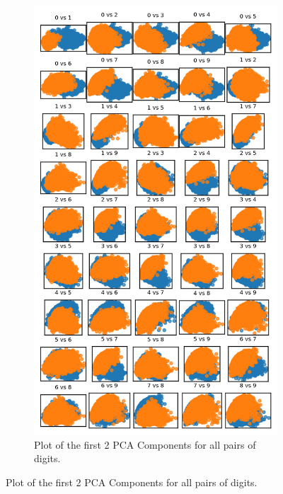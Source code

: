 \documentclass{article}
\begin{document}
\begin{figure}[h!]
    \centering
    \begin{subfigure}[t]{0.45\textwidth}
        \centering
        \includegraphics[width=\textwidth]{./plots/plot2.png} %
        \caption{Plot of the first 2 PCA Components for all pairs of digits.}
        \label{fig:plot2a}
    \end{subfigure}
    \hspace{0.02\textwidth}

\end{figure}
\end{document}
